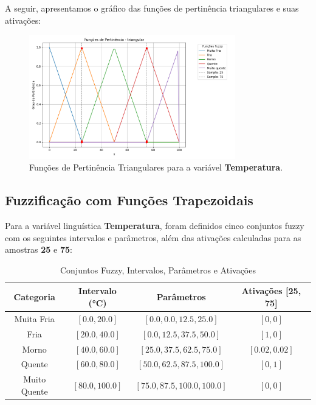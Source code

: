 \documentclass[a4paper,12pt]{article}
\begin{document}
A seguir, apresentamos o gráfico das funções de pertinência triangulares e suas ativações:

\begin{figure}[H]
    \centering
    \includegraphics[width=0.8\textwidth]{img/funções_de_pertinência_triangular_fuzzificado.png}
    \caption{Funções de Pertinência Triangulares para a variável \textbf{Temperatura}.}
\end{figure}


\subsection{Fuzzificação com Funções Trapezoidais}

Para a variável linguística \textbf{Temperatura}, foram definidos cinco conjuntos fuzzy com os seguintes intervalos e parâmetros, além das ativações calculadas para as amostras \textbf{25} e \textbf{75}:

\begin{table}[H]
\centering
\caption{Conjuntos Fuzzy, Intervalos, Parâmetros e Ativações}
\begin{tabular}{|c|c|c|c|}
\hline
\textbf{Categoria}    & \textbf{Intervalo (°C)} & \textbf{Parâmetros}               & \textbf{Ativações [25, 75]} \\ \hline
Muita Fria            & $[0.0, 20.0]$          & $[0.0, 0.0, 12.5, 25.0]$         & $[0, 0]$                   \\ \hline
Fria                  & $[20.0, 40.0]$         & $[0.0, 12.5, 37.5, 50.0]$        & $[1, 0]$                   \\ \hline
Morno                 & $[40.0, 60.0]$         & $[25.0, 37.5, 62.5, 75.0]$       & $[0.02, 0.02]$             \\ \hline
Quente                & $[60.0, 80.0]$         & $[50.0, 62.5, 87.5, 100.0]$      & $[0, 1]$                   \\ \hline
Muito Quente          & $[80.0, 100.0]$        & $[75.0, 87.5, 100.0, 100.0]$     & $[0, 0]$                   \\ \hline
\end{tabular}
\end{table}
\end{document}
